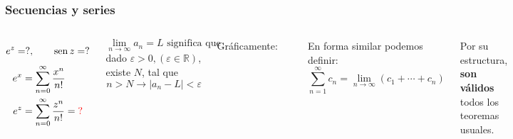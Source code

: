\documentclass[9pt, aspectratio=169]{beamer}
\begin{document}
\begin{frame}[t]
	\frametitle{Secuencias y series}
	\begin{columns}[t]
		\[ e^z = ?, \qquad \operatorname{sen} z = ? \]
		\begin{align*}
			e^x & = \sum_{n = 0}^{\infty} \frac{x^n}{n!}                      \\
			e^z & = \sum_{n = 0}^{\infty} \frac{z^n}{n!} = \textcolor{red}{?} \\
		\end{align*}
		\begin{definition}
			\vspace{-0.5em}
			\[ \lim_{n \rightarrow \infty} a_n = L \text{ significa que} \]
			dado $\varepsilon > 0, (\varepsilon \in \mathbb{R})$, existe $N$, tal que \vspace{-0.5em}
			\[ n > N \rightarrow |a_n - L| < \varepsilon \]

		\end{definition}

		Gráficamente:
		\begin{center}
			\includegraphics[scale=0.35]{figs/fig-11.pdf}
		\end{center}
		En forma similar podemos definir:
		\[ \sum_{n = 1}^{\infty} c_n = \lim_{n \rightarrow \infty} (c_1 + \cdots + c_n) \]

		Por su estructura, \textbf{son válidos} todos los teoremas usuales.


\end{columns}
\end{frame}
\end{document}
